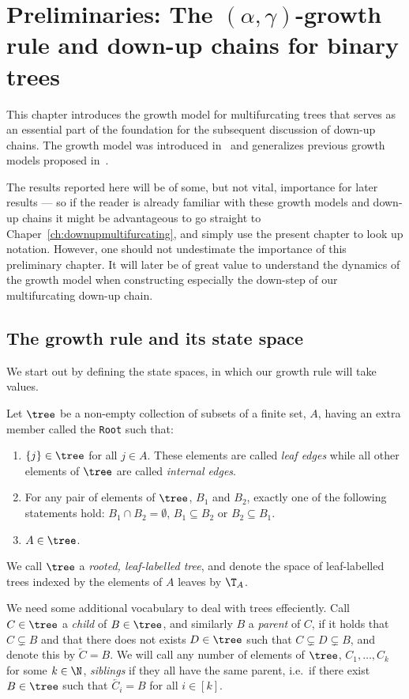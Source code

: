 \chapter{Preliminaries: The $(\alpha, \gamma)$-growth rule and down-up chains for binary trees}\label{ch:prelims}
%
This chapter introduces the growth model for multifurcating trees that serves as an essential part of the foundation for the subsequent discussion of down-up chains.
The growth model was introduced in~\cite{RefWorks:doc:5b4cbb5fe4b02dc0c79270af} and generalizes previous growth models proposed in~\cite{RefWorks:doc:5b76ce32e4b0820c421f301d,RefWorks:doc:5b6c561fe4b06c0731a5c558,RefWorks:doc:5b71b380e4b06c0731a629f4}.

The results reported here will be of some, but not vital, importance for later results --- so if the reader is already familiar with these growth models and down-up chains it might be advantageous to go straight to Chaper~\ref{ch:downupmultifurcating}, and simply use the present chapter to look up notation.
However, one should not undestimate the importance of this preliminary chapter.
It will later be of great value to understand the dynamics of the growth model when constructing especially the down-step of our multifurcating down-up chain.

\section{The growth rule and its state space}\label{sec:alphagammatrees}
%
We start out by defining the state spaces, in which our growth rule will take values.
%
\begin{defi}\label{leaflabelledtree}
  Let $\tree$ be a non-empty collection of subsets of a finite set, $A$, having an extra member called the \verb|Root| such that:
    \begin{enumerate}
        \item $\left\{ j \right\} \in \tree$ for all $j \in A$.
            These elements are called \textit{leaf edges} while all other elements of $\tree$ are called \textit{internal edges}.
        \item For any pair of elements of $\tree$, $B_1$ and $B_2$, exactly one of the following statements hold: $B_1 \cap B_2 = \emptyset$, $B_1 \subseteq B_2$ or $B_2 \subseteq B_1$.
        \item $A \in \tree$.
    \end{enumerate} 
    We call $\tree$ a \textit{rooted, leaf-labelled tree}, and denote the space of leaf-labelled trees indexed by the elements of $A$ leaves by $\T_A$.
\end{defi}
%
We need some additional vocabulary to deal with trees effeciently. 
Call $C \in \tree$ a \textit{child} of $B \in \tree$, and similarly $B$ a \textit{parent} of $C$, if it holds that $C \subsetneq B$ and that there does not exists $D \in \tree$ such that $C \subsetneq D \subsetneq B$, and denote this by $\overleftarrow{C} = B$.
We will call any number of elements of $\tree$, $C_1, \ldots, C_k$ for some $k \in \N$, \textit{siblings} if they all have the same parent, i.e.\ if there exist $B \in \tree$ such that $\overleftarrow{C_i} = B$ for all $i \in [k]$.

